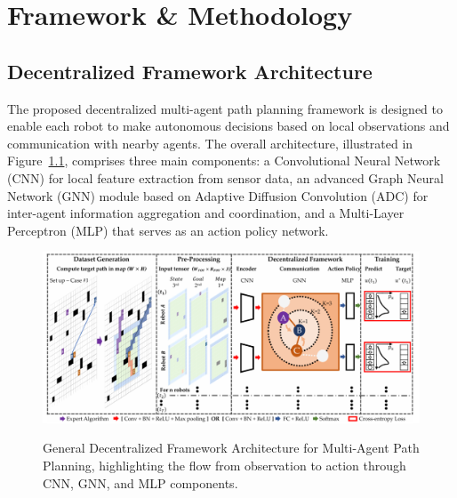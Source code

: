 \chapter{Framework \& Methodology}
\label{chap:methodology}

\section{Decentralized Framework Architecture}

The proposed decentralized multi-agent path planning framework is designed to enable each robot to make autonomous decisions based on local observations and communication with nearby agents. The overall architecture, illustrated in Figure~\ref{fig:framework_architecture}, comprises three main components: a Convolutional Neural Network (CNN) for local feature extraction from sensor data, an advanced Graph Neural Network (GNN) module based on Adaptive Diffusion Convolution (ADC) for inter-agent information aggregation and coordination, and a Multi-Layer Perceptron (MLP) that serves as an action policy network.

\begin{figure}[h]
    \centering
    \includegraphics[width=1\textwidth]{images/framework_figure.png} %
    \caption{General Decentralized Framework Architecture for Multi-Agent Path Planning, highlighting the flow from observation to action through CNN, GNN, and MLP components.}
    \label{fig:framework_architecture}
    \cite{Li2021GNNCoordination}
\end{figure}

